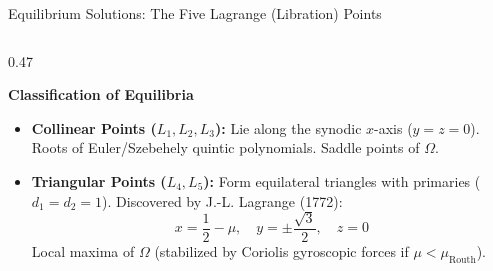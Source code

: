 \documentclass[aspectratio=169, 10pt]{beamer}
\begin{document}
\begin{frame}{Equilibrium Solutions: The Five Lagrange (Libration) Points}
\begin{columns}[t]
        \begin{column}{0.47\textwidth}
            \begin{block}{\textbf{Classification of Equilibria}}
                \scriptsize
                \begin{itemize}\setlength{\itemsep}{2.5pt}
                    \item \textbf{Collinear Points ($L_1, L_2, L_3$):}
                    Lie along the synodic $x$-axis ($y = z = 0$). Roots of Euler/Szebehely quintic polynomials. Saddle points of $\Omega$.
                    \item \textbf{Triangular Points ($L_4, L_5$):}
                    Form equilateral triangles with primaries ($d_1 = d_2 = 1$). Discovered by J.-L. Lagrange (1772):
                    \begin{equation*}
                        x = \frac{1}{2} - \mu, \quad y = \pm\frac{\sqrt{3}}{2}, \quad z = 0
                    \end{equation*}
                    Local maxima of $\Omega$ (stabilized by Coriolis gyroscopic forces if $\mu < \mu_{\text{Routh}}$).
                \end{itemize}
            \end{block}
        \end{column}
    \end{columns}
\end{frame}
\end{document}
